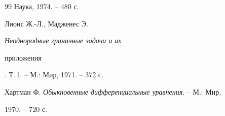 \begin{thebibliography}{99}
Наука, 1974. -- 480 с. 




Лионс Ж.-Л., Мадженес Э. {\em Неоднородные граничные задачи и их 


приложения}. Т.\,1. -- М.: Мир, 1971. -- 372 с. 




Хартман Ф. {\em Обыкновенные дифференциальные уравнения}. -- М.: Мир, 


1970. -- 720 с. 


 


\end{thebibliography} 


 


\vskip 0.5cm 


 






 


\label{end} 


 



